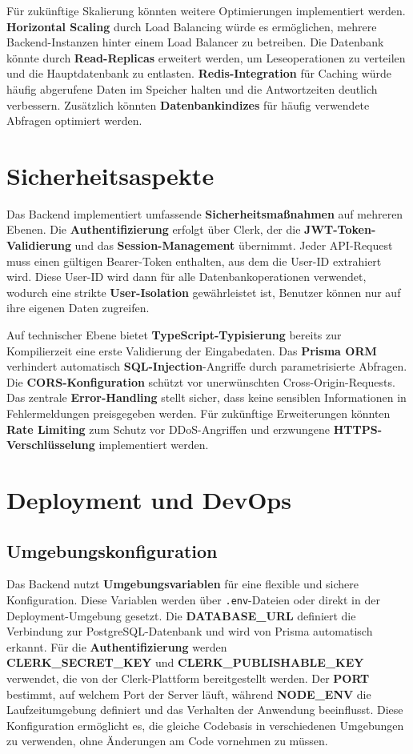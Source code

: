 Für zukünftige Skalierung könnten weitere Optimierungen implementiert werden. \textbf{Horizontal Scaling} durch Load Balancing würde es ermöglichen, mehrere Backend-Instanzen hinter einem Load Balancer zu betreiben. Die Datenbank könnte durch \textbf{Read-Replicas} erweitert werden, um Leseoperationen zu verteilen und die Hauptdatenbank zu entlasten. \textbf{Redis-Integration} für Caching würde häufig abgerufene Daten im Speicher halten und die Antwortzeiten deutlich verbessern. Zusätzlich könnten \textbf{Datenbankindizes} für häufig verwendete Abfragen optimiert werden.

\section{Sicherheitsaspekte}

Das Backend implementiert umfassende \textbf{Sicherheitsmaßnahmen} auf mehreren Ebenen. Die \textbf{Authentifizierung} erfolgt über Clerk, der die \textbf{JWT-Token-Validierung} und das \textbf{Session-Management} übernimmt. Jeder API-Request muss einen gültigen Bearer-Token enthalten, aus dem die User-ID extrahiert wird. Diese User-ID wird dann für alle Datenbankoperationen verwendet, wodurch eine strikte \textbf{User-Isolation} gewährleistet ist, Benutzer können nur auf ihre eigenen Daten zugreifen.

Auf technischer Ebene bietet \textbf{TypeScript-Typisierung} bereits zur Kompilierzeit eine erste Validierung der Eingabedaten. Das \textbf{Prisma ORM} verhindert automatisch \textbf{SQL-Injection}-Angriffe durch parametrisierte Abfragen. Die \textbf{CORS-Konfiguration} schützt vor unerwünschten Cross-Origin-Requests. Das zentrale \textbf{Error-Handling} stellt sicher, dass keine sensiblen Informationen in Fehlermeldungen preisgegeben werden. Für zukünftige Erweiterungen könnten \textbf{Rate Limiting} zum Schutz vor DDoS-Angriffen und erzwungene \textbf{HTTPS-Verschlüsselung} implementiert werden.

\section{Deployment und DevOps}

\subsection{Umgebungskonfiguration}

Das Backend nutzt \textbf{Umgebungsvariablen} für eine flexible und sichere Konfiguration. Diese Variablen werden über \texttt{.env}-Dateien oder direkt in der Deployment-Umgebung gesetzt. Die \textbf{DATABASE\_URL} definiert die Verbindung zur PostgreSQL-Datenbank und wird von Prisma automatisch erkannt. Für die \textbf{Authentifizierung} werden\\ \textbf{CLERK\_SECRET\_KEY} und \textbf{CLERK\_PUBLISHABLE\_KEY} verwendet, die von der Clerk-Plattform bereitgestellt werden. Der \textbf{PORT} bestimmt, auf welchem Port der Server läuft, während \textbf{NODE\_ENV} die Laufzeitumgebung definiert und das Verhalten der Anwendung beeinflusst. Diese Konfiguration ermöglicht es, die gleiche Codebasis in verschiedenen Umgebungen zu verwenden, ohne Änderungen am Code vornehmen zu müssen.

